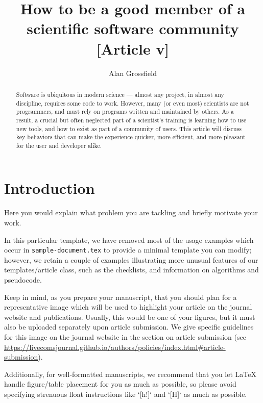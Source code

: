 \documentclass[9pt,training]{livecoms}
\title{How to be a good member of a scientific software community [Article v\versionnumber]}
\author[1*]{Alan Grossfield}
\affil[1]{University of Rochester Medical Center, Department of Biochemistry and Biophysics}
\begin{document}
\begin{frontmatter}
\maketitle

\begin{abstract}

Software is ubiquitous in modern science --- almost any project, in almost any
discipline, requires some code to work. However, many (or even most) scientists
are not programmers, and must rely on programs written and maintained by others.
As a result, a crucial but often neglected part of a scientist's training is
learning how to use new tools, and how to exist as part of a community of users.
This article will discuss key behaviors that can make the experience quicker,
more efficient, and more pleasant for the user and developer alike.


\end{abstract}

\end{frontmatter}




\section{Introduction}

Here you would explain what problem you are tackling and briefly motivate your work.

In this particular template, we have removed most of the usage examples which occur in \texttt{sample-document.tex} to provide a minimal template you can modify; however, we retain a couple of examples illustrating more unusual features of our templates/article class, such as the checklists, and information on algorithms and pseudocode.

Keep in mind, as you prepare your manuscript, that you should plan for a representative image  which will be used to highlight your article on the journal website and publications. Usually, this would be one of your figures, but it must also be uploaded separately upon article submission. We give specific guidelines for this image on the journal website in the section on article submission (see \url{https://livecomsjournal.github.io/authors/policies/index.html#article-submission}).

Additionally, for well-formatted manuscripts, we recommend that you let LaTeX handle figure/table placement for you as much as possible, so please avoid specifying strenuous float instructions like `[h!]` and `[H]` as much as possible.
\end{document}
